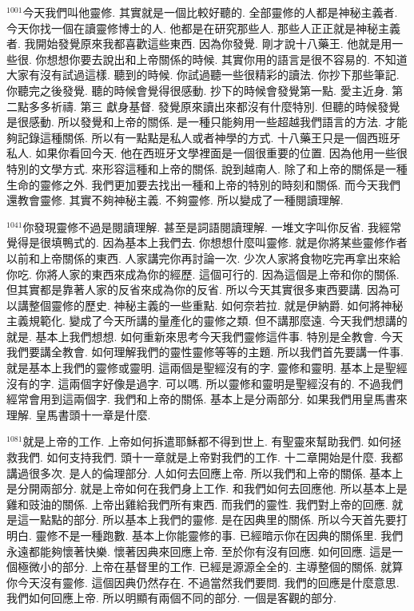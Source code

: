 \documentclass{book}
\begin{document}
$^{1001}$今天我們叫他靈修.
其實就是一個比較好聽的.
全部靈修的人都是神秘主義者.
今天你找一個在讀靈修博士的人.
他都是在研究那些人.
那些人正正就是神秘主義者.
我開始發覺原來我都喜歡這些東西.
因為你發覺.
剛才說十八藥王.
他就是用一些很.
你想想你要去說出和上帝關係的時候.
其實你用的語言是很不容易的.
不知道大家有沒有試過這樣.
聽到的時候.
你試過聽一些很精彩的讀法.
你抄下那些筆記.
你聽完之後發覺.
聽的時候會覺得很感動.
抄下的時候會發覺第一點.
愛主近身.
第二點多多祈禱.
第三 獻身基督.
發覺原來讀出來都沒有什麼特別.
但聽的時候發覺是很感動.
所以發覺和上帝的關係.
是一種只能夠用一些超越我們語言的方法.
才能夠記錄這種關係.
所以有一點點是私人或者神學的方式.
十八藥王只是一個西班牙私人.
如果你看回今天.
他在西班牙文學裡面是一個很重要的位置.
因為他用一些很特別的文學方式.
來形容這種和上帝的關係.
說到越南人.
除了和上帝的關係是一種生命的靈修之外.
我們更加要去找出一種和上帝的特別的時刻和關係.
而今天我們還教會靈修.
其實不夠神秘主義.
不夠靈修.
所以變成了一種閱讀理解.

$^{1041}$你發現靈修不過是閱讀理解.
甚至是詞語閱讀理解.
一堆文字叫你反省.
我經常覺得是很填鴨式的.
因為基本上我們去.
你想想什麼叫靈修.
就是你將某些靈修作者以前和上帝關係的東西.
人家講完你再討論一次.
少次人家將食物吃完再拿出來給你吃.
你將人家的東西來成為你的經歷.
這個可行的.
因為這個是上帝和你的關係.
但其實都是靠著人家的反省來成為你的反省.
所以今天其實很多東西要講.
因為可以講整個靈修的歷史.
神秘主義的一些重點.
如何奈若拉.
就是伊納爵.
如何將神秘主義規範化.
變成了今天所講的量產化的靈修之類.
但不講那麼遠.
今天我們想講的就是.
基本上我們想想.
如何重新來思考今天我們靈修這件事.
特別是全教會.
今天我們要講全教會.
如何理解我們的靈性靈修等等的主題.
所以我們首先要講一件事.
就是基本上我們的靈修或靈明.
這兩個是聖經沒有的字.
靈修和靈明.
基本上是聖經沒有的字.
這兩個字好像是過字.
可以嗎.
所以靈修和靈明是聖經沒有的.
不過我們經常會用到這兩個字.
我們和上帝的關係.
基本上是分兩部分.
如果我們用皇馬書來理解.
皇馬書頭十一章是什麼.

$^{1081}$就是上帝的工作.
上帝如何拆遣耶穌都不得到世上.
有聖靈來幫助我們.
如何拯救我們.
如何支持我們.
頭十一章就是上帝對我們的工作.
十二章開始是什麼.
我都講過很多次.
是人的倫理部分.
人如何去回應上帝.
所以我們和上帝的關係.
基本上是分開兩部分.
就是上帝如何在我們身上工作.
和我們如何去回應他.
所以基本上是雞和豉油的關係.
上帝出雞給我們所有東西.
而我們的靈性.
我們對上帝的回應.
就是這一點點的部分.
所以基本上我們的靈修.
是在因典里的關係.
所以今天首先要打明白.
靈修不是一種跑數.
基本上你能靈修的事.
已經暗示你在因典的關係里.
我們永遠都能夠懷著快樂.
懷著因典來回應上帝.
至於你有沒有回應.
如何回應.
這是一個極微小的部分.
上帝在基督里的工作.
已經是源源全全的.
主導整個的關係.
就算你今天沒有靈修.
這個因典仍然存在.
不過當然我們要問.
我們的回應是什麼意思.
我們如何回應上帝.
所以明顯有兩個不同的部分.
一個是客觀的部分.
\end{document}
